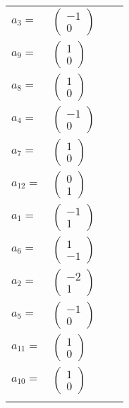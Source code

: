 \documentclass[1p]{elsarticle_modified}
\theoremstyle{definition}
\begin{document}
\begin{tabular}{m{7pt} m{180pt} m{7pt} m{180pt} }
\flushright $a_{3}=$&$\begin{pmatrix}-1\\0\end{pmatrix}$ \\
\flushright $a_{9}=$&$\begin{pmatrix}1\\0\end{pmatrix}$ \\
\flushright $a_{8}=$&$\begin{pmatrix}1\\0\end{pmatrix}$ \\
\flushright $a_{4}=$&$\begin{pmatrix}-1\\0\end{pmatrix}$ \\
\flushright $a_{7}=$&$\begin{pmatrix}1\\0\end{pmatrix}$ \\
\flushright $a_{12}=$&$\begin{pmatrix}0\\1\end{pmatrix}$ \\
\flushright $a_{1}=$&$\begin{pmatrix}-1\\1\end{pmatrix}$ \\
\flushright $a_{6}=$&$\begin{pmatrix}1\\-1\end{pmatrix}$ \\
\flushright $a_{2}=$&$\begin{pmatrix}-2\\1\end{pmatrix}$ \\
\flushright $a_{5}=$&$\begin{pmatrix}-1\\0\end{pmatrix}$ \\
\flushright $a_{11}=$&$\begin{pmatrix}1\\0\end{pmatrix}$ \\
\flushright $a_{10}=$&$\begin{pmatrix}1\\0\end{pmatrix}$\\&\end{tabular}
\end{document}
